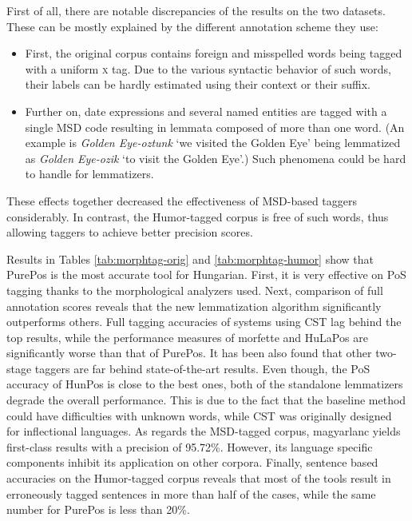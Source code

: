 First of all, there are notable discrepancies of the results on the two datasets. These can be mostly explained by the different annotation scheme they use:
\begin{itemize}
  \item First, the original corpus contains foreign and misspelled words being tagged with a uniform \textsc{x} tag. Due to the various syntactic behavior of such words, their labels can be hardly estimated using their context or their suffix.
  \item Further on, date expressions and several named entities are tagged with a single MSD code resulting in lemmata composed of more than one word. (An example is \emph{Golden Eye-oztunk} `we visited the Golden Eye’ being lemmatized as \emph{Golden Eye-ozik} `to visit the Golden Eye’.) 
  Such phenomena could be hard to handle for lemmatizers.
\end{itemize}

These effects together decreased the effectiveness of MSD-based taggers considerably. 
In contrast, the Humor-tagged corpus is free of such words, thus allowing taggers to achieve better precision scores.

Results in Tables \ref{tab:morphtag-orig} and \ref{tab:morphtag-humor} show that PurePos is the most accurate tool for Hungarian. 
First, it is very effective on PoS tagging thanks to the morphological analyzers used. 
Next, comparison of full annotation scores reveals that the new lemmatization algorithm significantly outperforms others. 
Full tagging accuracies of systems using CST lag behind the top results, while the performance measures of morfette and HuLaPos are significantly worse than that of PurePos.  
It has been also found that other two-stage taggers are far behind state-of-the-art results. 
Even though, the PoS accuracy of HunPos is close to the best ones, both of the standalone lemmatizers degrade the overall performance. 
This is due to the fact that the baseline method could have difficulties with unknown words, while CST was originally designed for inflectional languages. 
As regards the MSD-tagged corpus, magyarlanc yields first-class results with a precision of 95.72\%. 
However, its language specific components inhibit its application on other corpora. Finally, sentence based accuracies on the Humor-tagged corpus reveals that most of the tools result in erroneously tagged sentences in more than half of the cases, while the same number for PurePos is less than 20\%.



